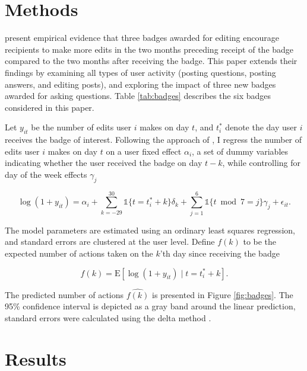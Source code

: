 \documentclass[conference]{IEEEtran}
\newcommand{\1}{\mathds{1}}
\newcommand{\E}{\mathrm{E}}
\begin{document}
\section{Methods}

\citet{Grant2013} present empirical evidence that three badges awarded for editing encourage recipients to make more edits in the two months preceding receipt of the badge compared to the two months after receiving the badge. This paper extends their findings by examining all types of user activity (posting questions, posting answers, and editing posts), and exploring the impact of three new badges awarded for asking questions. Table \ref{tab:badges} describes the six badges considered in this paper.




Let $y_{it}$ be the number of edits user $i$ makes on day $t$, and $t_i^*$ denote the day user $i$ receives the badge of interest. Following the approach of \citet{Jacobson1993}, I regress the number of edits user $i$ makes on day $t$ on a user fixed effect $\alpha_i$, a set of dummy variables indicating whether the user received the badge on day $t-k$, while controlling for day of the week effects $\gamma_j$

\begin{equation}
\log(1 + y_{it}) = \alpha_i + \sum_{k=-29}^{30} \1 \{ t = t_i^* + k \} \delta_k + \sum_{j=1}^6 \1 \{ t \bmod 7 = j \} \gamma_j + \epsilon_{it}.
\end{equation}

The model parameters are estimated using an ordinary least squares regression, and standard errors are clustered at the user level. Define $f(k)$ to be the expected number of actions taken on the $k$'th day since receiving the badge

\begin{equation}
f(k) = \E \left[ \log(1 + y_{it}) \; | \; t=t^*_i + k \right].
\end{equation}

The predicted number of actions $\hat{f(k)}$ is presented in Figure \ref{fig:badges}. The 95\% confidence interval is depicted as a gray band around the linear prediction, standard errors were calculated using the delta method \citep{Williams2012}.

\section{Results}
\end{document}
